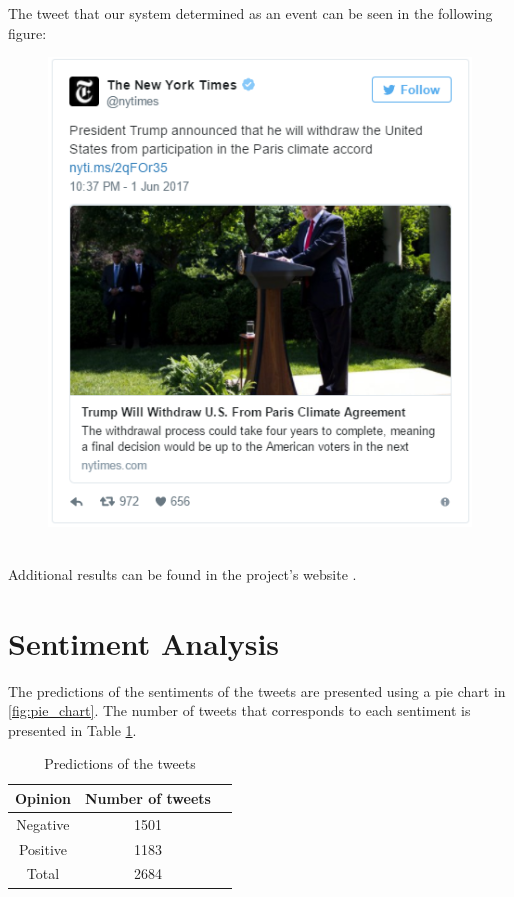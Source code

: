 \documentclass[12pt,svgnames]{report}
\begin{document}
\newpage
The tweet that our system determined as an event can be seen in the following figure:
\begin{figure}[h]
\centering
\includegraphics[scale=1]{hashparistweet.png}
\end{figure}
\\
Additional results can be found in the project's website \cite{projectwebsite}.

\section*{Sentiment Analysis}
The predictions of the sentiments of the tweets are presented using a pie chart in \ref{fig:pie_chart}. The number of tweets that corresponds to each sentiment is presented in Table \ref{tab:sentis}.

\begin{table}[h!]
	\centering	
	\begin{tabular}{ccc}
		\toprule
		Opinion & Number of tweets\\
		\midrule
		Negative & 1501\\
		Positive & 1183\\		
		\bottomrule
		Total & 2684
	\end{tabular}
	\caption{Predictions of the tweets}
	\label{tab:sentis}
\end{table}
\end{document}
